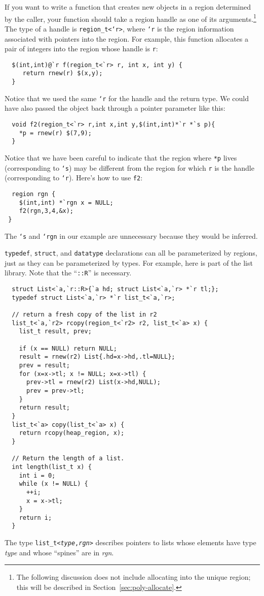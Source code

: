 If you want to write a function that creates new objects in a region
determined by the caller, your function should take a region handle as one
of its arguments.\footnote{The following discussion does not include
allocating into the unique region; this will be described in
Section~\ref{sec:poly-allocate}.}  The type of a handle is
\texttt{region_t<`r>}, where \texttt{`r} is the region information
associated with pointers into the region.  For example, this function
allocates a pair of integers into the region whose handle is \texttt{r}:
\begin{verbatim}
  $(int,int)@`r f(region_t<`r> r, int x, int y) { 
     return rnew(r) $(x,y);
  }
\end{verbatim}
Notice that we used the same \texttt{`r} for the handle and the return
type.  We could have also passed the object back through a pointer
parameter like this:
\begin{verbatim}
  void f2(region_t<`r> r,int x,int y,$(int,int)*`r *`s p){ 
    *p = rnew(r) $(7,9); 
  }
\end{verbatim}

Notice that we have been careful to indicate that the region where
\texttt{*p} lives (corresponding to \texttt{`s}) may be different from
the region for which \texttt{r} is the handle (corresponding to
\texttt{`r}).  Here's how to use \texttt{f2}:
\begin{verbatim}
  region rgn { 
    $(int,int) *`rgn x = NULL; 
    f2(rgn,3,4,&x);
 }
\end{verbatim} %
The \texttt{`s} and \texttt{`rgn} in our example are unnecessary
because they would be inferred.

\texttt{typedef}, \texttt{struct}, and \texttt{datatype}
declarations can all be parameterized by regions,
just as they can be parameterized by types.  For example, here is part
of the list library.  Note that the ``\texttt{::R}'' is necessary.
\begin{verbatim}
  struct List<`a,`r::R>{`a hd; struct List<`a,`r> *`r tl;};
  typedef struct List<`a,`r> *`r list_t<`a,`r>;

  // return a fresh copy of the list in r2
  list_t<`a,`r2> rcopy(region_t<`r2> r2, list_t<`a> x) {
    list_t result, prev;

    if (x == NULL) return NULL;
    result = rnew(r2) List{.hd=x->hd,.tl=NULL};
    prev = result;
    for (x=x->tl; x != NULL; x=x->tl) {
      prev->tl = rnew(r2) List(x->hd,NULL);
      prev = prev->tl;
    }
    return result;
  }  
  list_t<`a> copy(list_t<`a> x) {
    return rcopy(heap_region, x);
  }

  // Return the length of a list. 
  int length(list_t x) {
    int i = 0;
    while (x != NULL) {
      ++i;
      x = x->tl;
    }
    return i;
  }
\end{verbatim}
The type \texttt{list_t<\textit{type},\textit{rgn}>} describes
pointers to lists whose elements have type \textit{type} and whose
``spines'' are in \textit{rgn}.  

